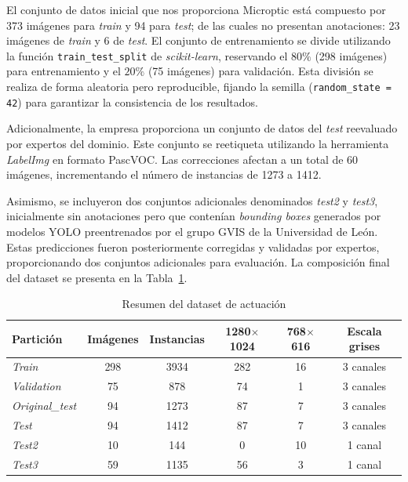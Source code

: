 \documentclass[12pt,a4paper,onecolumn,oneside]{report}
\begin{document}
El conjunto de datos inicial que nos proporciona Microptic \cite{microptic} está compuesto por 373 imágenes para \textit{train} y 94 para \textit{test}; de las cuales no presentan anotaciones: 23 imágenes de \textit{train} y 6 de \textit{test}.
El conjunto de entrenamiento se divide utilizando la función \texttt{train\_test\_split} de \textit{scikit-learn}, reservando el $80\%$ (298 imágenes) para entrenamiento y el $20\%$ (75 imágenes) para validación. 
Esta división se realiza de forma aleatoria pero reproducible, fijando la semilla (\texttt{random\_state = 42}) para garantizar la consistencia de los resultados.

Adicionalmente, la empresa proporciona un conjunto de datos del \textit{test} reevaluado por expertos del dominio. Este conjunto se reetiqueta utilizando la herramienta \textit{LabelImg} \cite{labelimg_github} en formato PascVOC. 
Las correcciones afectan a un total de 60 imágenes, incrementando el número de instancias de 1273 a 1412.

Asimismo, se incluyeron dos conjuntos adicionales denominados \textit{test2} y \textit{test3}, inicialmente sin anotaciones pero que contenían \textit{bounding boxes} generados por modelos YOLO \cite{ultralytics_models} preentrenados 
por el grupo GVIS de la Universidad de León. Estas predicciones fueron posteriormente corregidas y validadas por expertos, proporcionando dos conjuntos adicionales para evaluación. 
La composición final del dataset se presenta en la Tabla~\ref{tab:dataset_final}.

\clearpage
\begin{table}[htbp]
\centering
{}
\begin{tabular}{l c c c c c}
\toprule
Partición & Imágenes & Instancias & 1280$\times$1024 & 768$\times$616 & Escala grises\\
\midrule
\textit{Train}          & 298 & 3934 & 282 & 16 & 3 canales\\
\textit{Validation}     &  75 &  878 & 74  & 1  & 3 canales\\
\textit{Original\_test} &  94 & 1273 & 87  & 7  & 3 canales\\
\textit{Test}           &  94 & 1412 & 87  & 7  & 3 canales\\
\textit{Test2}          &  10 &  144 & 0   & 10 & 1 canal\\
\textit{Test3}          &  59 & 1135 & 56  & 3  & 1 canal\\
\bottomrule
\end{tabular}
\caption{Resumen del dataset de actuación}
\label{tab:dataset_final}
\end{table}
\end{document}
